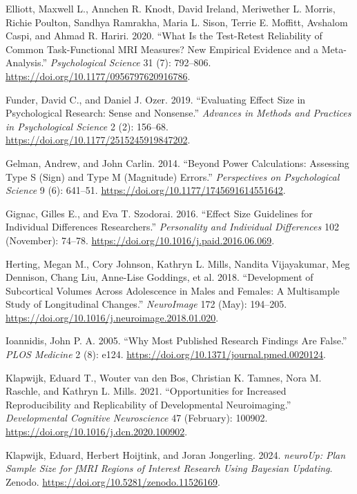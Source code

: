 \documentclass[
  letterpaper,
  DIV=11,
  numbers=noendperiod]{scrartcl}
\newlength{\cslhangindent}
\newenvironment{CSLReferences}[2] %
 {\begin{list}{}{%
  \setlength{\itemindent}{0pt}
  \setlength{\leftmargin}{0pt}
  \setlength{\parsep}{0pt}
  \ifodd #1
   \setlength{\leftmargin}{\cslhangindent}
   \setlength{\itemindent}{-1\cslhangindent}
  \fi
  \setlength{\itemsep}{#2\baselineskip}}}
 {\end{list}}
\begin{document}
\begin{CSLReferences}{1}{0}
Elliott, Maxwell L., Annchen R. Knodt, David Ireland, Meriwether L.
Morris, Richie Poulton, Sandhya Ramrakha, Maria L. Sison, Terrie E.
Moffitt, Avshalom Caspi, and Ahmad R. Hariri. 2020. {``What Is the
Test-Retest Reliability of Common Task-Functional MRI Measures? New
Empirical Evidence and a Meta-Analysis.''} \emph{Psychological Science}
31 (7): 792--806. \url{https://doi.org/10.1177/0956797620916786}.

Funder, David C., and Daniel J. Ozer. 2019. {``Evaluating Effect Size in
Psychological Research: Sense and Nonsense.''} \emph{Advances in Methods
and Practices in Psychological Science} 2 (2): 156--68.
\url{https://doi.org/10.1177/2515245919847202}.

Gelman, Andrew, and John Carlin. 2014. {``Beyond Power Calculations:
Assessing Type S (Sign) and Type M (Magnitude) Errors.''}
\emph{Perspectives on Psychological Science} 9 (6): 641--51.
\url{https://doi.org/10.1177/1745691614551642}.

Gignac, Gilles E., and Eva T. Szodorai. 2016. {``Effect Size Guidelines
for Individual Differences Researchers.''} \emph{Personality and
Individual Differences} 102 (November): 74--78.
\url{https://doi.org/10.1016/j.paid.2016.06.069}.

Herting, Megan M., Cory Johnson, Kathryn L. Mills, Nandita Vijayakumar,
Meg Dennison, Chang Liu, Anne-Lise Goddings, et al. 2018. {``Development
of Subcortical Volumes Across Adolescence in Males and Females: A
Multisample Study of Longitudinal Changes.''} \emph{NeuroImage} 172
(May): 194--205. \url{https://doi.org/10.1016/j.neuroimage.2018.01.020}.

Ioannidis, John P. A. 2005. {``Why Most Published Research Findings Are
False.''} \emph{PLOS Medicine} 2 (8): e124.
\url{https://doi.org/10.1371/journal.pmed.0020124}.

Klapwijk, Eduard T., Wouter van den Bos, Christian K. Tamnes, Nora M.
Raschle, and Kathryn L. Mills. 2021. {``Opportunities for Increased
Reproducibility and Replicability of Developmental Neuroimaging.''}
\emph{Developmental Cognitive Neuroscience} 47 (February): 100902.
\url{https://doi.org/10.1016/j.dcn.2020.100902}.

Klapwijk, Eduard, Herbert Hoijtink, and Joran Jongerling. 2024.
\emph{neuroUp: Plan Sample Size for fMRI Regions of Interest Research
Using Bayesian Updating}. Zenodo.
\url{https://doi.org/10.5281/zenodo.11526169}.


\end{CSLReferences}
\end{document}
